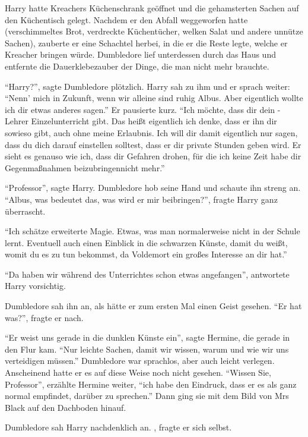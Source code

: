 Harry hatte Kreachers Küchenschrank geöffnet und die gehamsterten Sachen auf den Küchentisch gelegt. Nachdem er den Abfall weggeworfen hatte (verschimmeltes Brot, verdreckte Küchentücher, welken Salat und andere unnütze Sachen), zauberte er eine Schachtel herbei, in die er die Reste legte, welche er Kreacher bringen würde. Dumbledore lief unterdessen durch das Haus und entfernte die Dauerklebezauber der Dinge, die man nicht mehr brauchte.

\enquote{Harry?}, sagte Dumbledore plötzlich. Harry sah zu ihm und er sprach weiter: \enquote{Nenn’ mich in Zukunft, wenn wir alleine sind ruhig Albus. \gst Aber eigentlich wollte ich dir etwas anderes sagen.} Er pausierte kurz. \enquote{Ich möchte, dass dir dein \VgddK-Lehrer Einzelunterricht gibt. Das heißt eigentlich \gst ich denke, dass er ihn dir sowieso gibt, auch ohne meine Erlaubnis. \gst Ich will dir damit eigentlich nur sagen, dass du dich darauf einstellen solltest, dass er dir private Stunden geben wird. \gst Er sieht es genauso wie ich, dass dir Gefahren drohen, für die ich keine Zeit habe dir Gegenmaßnahmen beizubringen\abs nicht mehr.}

\enquote{Professor}, sagte Harry. Dumbledore hob seine Hand und schaute ihn streng an. \enquote{Albus, was bedeutet das, was wird er mir beibringen?}, fragte Harry ganz überrascht.

\enquote{Ich schätze erweiterte Magie. Etwas, was man normalerweise nicht in der Schule lernt. Eventuell auch einen Einblick in die schwarzen Künste, damit du weißt, womit du es zu tun bekommst, da Voldemort ein großes Interesse an dir hat.}

\enquote{Da haben wir während des Unterrichtes schon etwas angefangen}, antwortete Harry vorsichtig.

Dumbledore sah ihn an, als hätte er zum ersten Mal einen Geist gesehen. \enquote{Er hat was?}, fragte er nach.

\enquote{Er weist uns gerade in die dunklen Künste ein}, sagte Hermine, die gerade in den Flur kam. \enquote{Nur leichte Sachen, damit wir wissen, warum und wie wir uns verteidigen müssen.} Dumbledore war sprachlos, aber auch leicht verlegen. Anscheinend hatte er es auf diese Weise noch nicht gesehen. \enquote{Wissen Sie, Professor}, erzählte Hermine weiter, \enquote{ich habe den Eindruck, dass er es als ganz normal empfindet, darüber zu sprechen.} Dann ging sie mit dem Bild von Mrs Black auf den Dachboden hinauf.

Dumbledore sah Harry nachdenklich an. , fragte er sich selbst.

